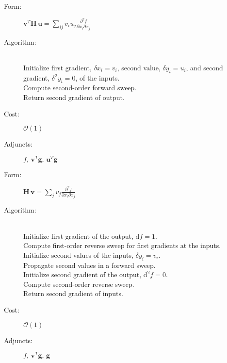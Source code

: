 \begin{tcolorbox}[colback=white,colframe=gray90, coltitle=black,boxrule=3pt,
fonttitle=\bfseries,title=Hessian Quadratic Form]

	\begin{description}
		\item[Form:] 
		$\displaystyle \mathbf{v}^{T} \mathbf{H} \, \mathbf{u} = 
		\sum_{ij} v_{i} u_{j} \frac{ \partial^{2} f }{ \partial x_{i} \partial x_{j} } $
		\item[Algorithm:] \hfill \\
		Initialize first gradient, $\delta x_{i} = v_{i}$, second value, $\delta y_{i} = u_{i}$,
		and second gradient, $\delta^{2} y_{i} = 0$, of the inputs. \\
		Compute second-order forward sweep. \\
		Return second gradient of output.
		\item[Cost:] $\mathcal{O} \! \left( 1 \right)$
		\item[Adjuncts:] $ f, \, \mathbf{v}^{T} \mathbf{g}, \, \mathbf{u}^{T} \mathbf{g}$
	\end{description}
	
\end{tcolorbox}

\begin{tcolorbox}[colback=white,colframe=gray90, coltitle=black,boxrule=3pt,
fonttitle=\bfseries,title=Hessian-Vector Product]
	
	\begin{description}
		\item[Form:] $\displaystyle \mathbf{H} \, \mathbf{v} = 
		\sum_{j} v_{j} \frac{ \partial^{2} f }{ \partial x_{i} \partial x_{j} } $
		\item[Algorithm:] \hfill \\
		Initialize first gradient of the output, $\mathrm{d} f = 1$. \\
		Compute first-order reverse sweep for first gradients at the inputs. \\
		Initialize second values of the inputs, $\delta y_{i} = v_{i}$. \\
		Propagate second values in a forward sweep. \\
		Initialize second gradient of the output, $\mathrm{d}^{2} f = 0.$ \\
		Compute second-order reverse sweep. \\
		Return second gradient of inputs.
		\item[Cost:] $\mathcal{O} \! \left( 1 \right)$
		\item[Adjuncts:] $ f, \, \mathbf{v}^{T} \mathbf{g}, \, \mathbf{g}$
	\end{description}
	
\end{tcolorbox}

